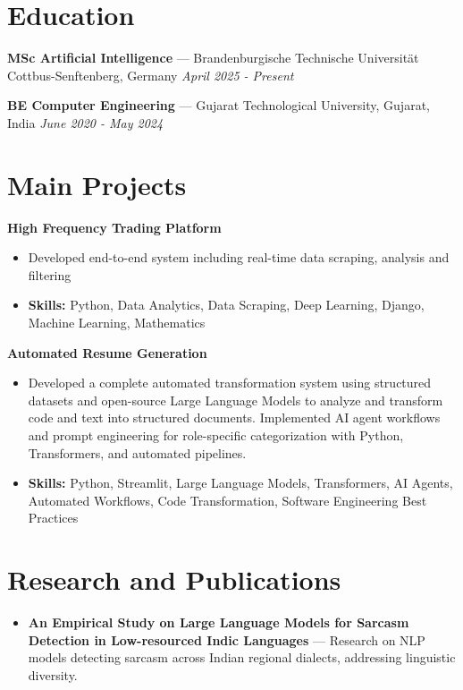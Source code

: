\documentclass[a4paper,10pt]{article}
\begin{document}
\section*{Education}
\textbf{MSc Artificial Intelligence} — Brandenburgische Technische Universität Cottbus-Senftenberg, Germany \hfill \textit{April 2025 - Present}\par
\vspace{1.5pt}
\textbf{BE Computer Engineering} — Gujarat Technological University, Gujarat, India \hfill \textit{June 2020 - May 2024}\par

\section*{Main Projects}
\textbf{High Frequency Trading Platform}\par
\vspace{1pt}
\begin{itemize}
  \item Developed end-to-end system including real-time data scraping, analysis and filtering
  \item \textbf{Skills:} Python, Data Analytics, Data Scraping, Deep Learning, Django, Machine Learning, Mathematics
\end{itemize}
\vspace{3pt}
\textbf{Automated Resume Generation}\par
\vspace{1pt}
\begin{itemize}
  \item Developed a complete automated transformation system using structured datasets and open-source Large Language Models to analyze and transform code and text into structured documents. Implemented AI agent workflows and prompt engineering for role-specific categorization with Python, Transformers, and automated pipelines.
  \item \textbf{Skills:} Python, Streamlit, Large Language Models, Transformers, AI Agents, Automated Workflows, Code Transformation, Software Engineering Best Practices
\end{itemize}

\section*{Research and Publications}
\begin{itemize}
\item \textbf{An Empirical Study on Large Language Models for Sarcasm Detection in Low-resourced Indic Languages} — Research on NLP models detecting sarcasm across Indian regional dialects, addressing linguistic diversity.
\end{itemize}
\end{document}

